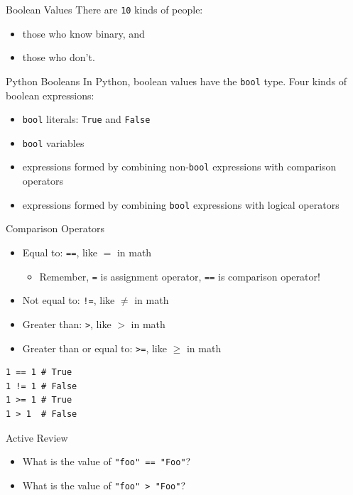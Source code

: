 \documentclass[smaller, aspectratio=1610]{beamer}
\begin{document}
\begin{frame}[label={sec:org06a0fba},fragile]{Boolean Values}
 There are \texttt{10} kinds of people:

\begin{itemize}
\item those who know binary, and
\item those who don't.
\end{itemize}
\end{frame}

\begin{frame}[label={sec:org457d145},fragile]{Python Booleans}
 In Python, boolean values have the \texttt{bool} type. Four kinds of boolean
expressions:

\begin{itemize}
\item \texttt{bool} literals: \texttt{True} and \texttt{False}
\item \texttt{bool} variables
\item expressions formed by combining non-\texttt{bool} expressions with comparison operators
\item expressions formed by combining \texttt{bool} expressions with logical operators
\end{itemize}
\end{frame}

\begin{frame}[label={sec:org1a2935d},fragile]{Comparison Operators}
 \begin{itemize}
\item Equal to: \texttt{==}, like \(=\) in math

\begin{itemize}
\item Remember, \texttt{=} is assignment operator, \texttt{==} is comparison operator!
\end{itemize}

\item Not equal to: \texttt{!=}, like \(\ne\) in math
\item Greater than: \texttt{>}, like \(>\) in math
\item Greater than or equal to: \texttt{>=}, like \(\ge\) in math
\end{itemize}

\lstset{language=Python,label= ,caption= ,captionpos=b,numbers=none}
\begin{lstlisting}
1 == 1 # True
1 != 1 # False
1 >= 1 # True
1 > 1  # False
\end{lstlisting}

\begin{block}{Active Review}
\begin{itemize}
\item What is the value of \texttt{"foo" == "Foo"}?
\item What is the value of \texttt{"foo" > "Foo"}?
\end{itemize}
\end{block}
\end{frame}
\end{document}
